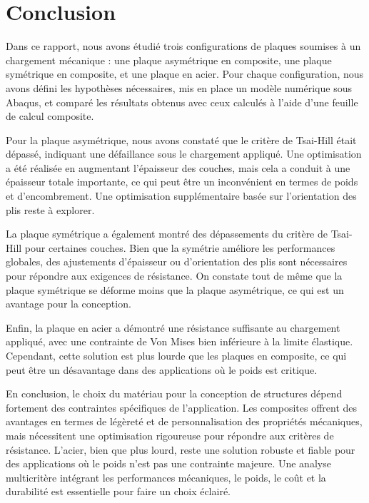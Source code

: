 \documentclass[a4paper,12pt]{article}
\begin{document}
\section{Conclusion}
Dans ce rapport, nous avons étudié trois configurations de plaques soumises à un chargement mécanique : une plaque asymétrique en composite, une plaque symétrique en composite, et une plaque en acier. Pour chaque configuration, nous avons défini les hypothèses nécessaires, mis en place un modèle numérique sous Abaqus, et comparé les résultats obtenus avec ceux calculés à l'aide d'une feuille de calcul composite.

Pour la plaque asymétrique, nous avons constaté que le critère de Tsai-Hill était dépassé, indiquant une défaillance sous le chargement appliqué. Une optimisation a été réalisée en augmentant l'épaisseur des couches, mais cela a conduit à une épaisseur totale importante, ce qui peut être un inconvénient en termes de poids et d'encombrement. Une optimisation supplémentaire basée sur l'orientation des plis reste à explorer.

La plaque symétrique a également montré des dépassements du critère de Tsai-Hill pour certaines couches. Bien que la symétrie améliore les performances globales, des ajustements d'épaisseur ou d'orientation des plis sont nécessaires pour répondre aux exigences de résistance. On constate tout de même que la plaque symétrique se déforme moins que la plaque asymétrique, ce qui est un avantage pour la conception.

Enfin, la plaque en acier a démontré une résistance suffisante au chargement appliqué, avec une contrainte de Von Mises bien inférieure à la limite élastique. Cependant, cette solution est plus lourde que les plaques en composite, ce qui peut être un désavantage dans des applications où le poids est critique.

En conclusion, le choix du matériau pour la conception de structures dépend fortement des contraintes spécifiques de l'application. Les composites offrent des avantages en termes de légèreté et de personnalisation des propriétés mécaniques, mais nécessitent une optimisation rigoureuse pour répondre aux critères de résistance. L'acier, bien que plus lourd, reste une solution robuste et fiable pour des applications où le poids n'est pas une contrainte majeure. Une analyse multicritère intégrant les performances mécaniques, le poids, le coût et la durabilité est essentielle pour faire un choix éclairé.
\end{document}
